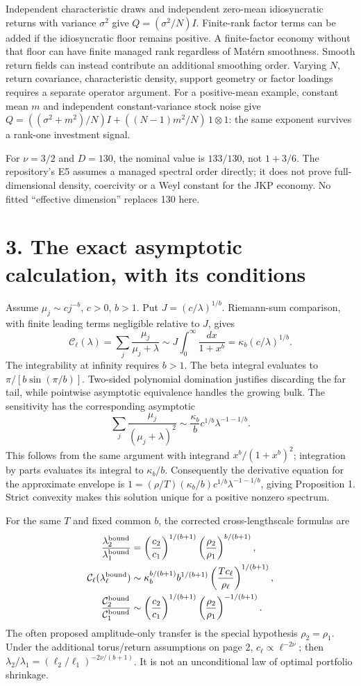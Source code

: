 \documentclass[11pt,letterpaper]{article}
\newcommand{\C}{\mathcal C}
\begin{document}
Independent characteristic draws and independent zero-mean idiosyncratic
returns with variance $\sigma^2$ give $Q=(\sigma^2/N)I$. Finite-rank factor
terms can be added if the idiosyncratic floor remains positive. A finite-factor
economy without that floor can have finite managed rank regardless of Mat\'ern
smoothness. Smooth return fields can instead contribute an additional smoothing
order. Varying $N$, return covariance, characteristic density, support geometry
or factor loadings requires a separate operator argument.
For a positive-mean example, constant mean $m$ and independent constant-variance
stock noise give $Q=((\sigma^2+m^2)/N)I+((N-1)m^2/N)\,1\otimes1$:
the same exponent survives a rank-one investment signal.

For $\nu=3/2$ and $D=130$, the nominal value is $133/130$, not $1+3/6$.
The repository's E5 assumes a managed spectral order directly; it does not prove
full-dimensional density, coercivity or a Weyl constant for the JKP economy.
No fitted ``effective dimension'' replaces 130 here.

\newpage
\section*{3. The exact asymptotic calculation, with its conditions}
Assume $\mu_j\sim cj^{-b}$, $c>0$, $b>1$. Put $J=(c/\lambda)^{1/b}$.
Riemann-sum comparison, with finite leading terms negligible relative to $J$,
gives
\[
 \C_\ell(\lambda)=\sum_j\frac{\mu_j}{\mu_j+\lambda}
 \sim J\int_0^\infty\frac{dx}{1+x^b}=\kappa_b(c/\lambda)^{1/b}.
\]
The integrability at infinity requires $b>1$. The beta integral evaluates to
$\pi/[b\sin(\pi/b)]$. Two-sided polynomial domination justifies discarding
the far tail, while pointwise asymptotic equivalence handles the growing bulk.
The sensitivity has the corresponding asymptotic
\[
 \sum_j\frac{\mu_j}{(\mu_j+\lambda)^2}
 \sim\frac{\kappa_b}{b}c^{1/b}\lambda^{-1-1/b}.
\]
This follows from the same argument with integrand $x^b/(1+x^b)^2$;
integration by parts evaluates its integral to $\kappa_b/b$.
Consequently the derivative equation for the approximate envelope is
$1=(\rho/T)(\kappa_b/b)c^{1/b}\lambda^{-1-1/b}$, giving Proposition 1.
Strict convexity makes this solution unique for a positive nonzero spectrum.

For the same $T$ and fixed common $b$, the corrected cross-lengthscale formulas are
\begin{align*}
 \frac{\lambda_2^{\rm bound}}{\lambda_1^{\rm bound}}
 &=\left(\frac{c_2}{c_1}\right)^{1/(b+1)}
   \left(\frac{\rho_2}{\rho_1}\right)^{b/(b+1)},\\
 \C_\ell(\lambda_\ell^{\rm bound})
 &\sim\kappa_b^{b/(b+1)}b^{1/(b+1)}
       \left(\frac{Tc_\ell}{\rho_\ell}\right)^{1/(b+1)},\\
 \frac{\C_2^{\rm bound}}{\C_1^{\rm bound}}
 &\sim\left(\frac{c_2}{c_1}\right)^{1/(b+1)}
       \left(\frac{\rho_2}{\rho_1}\right)^{-1/(b+1)}.
\end{align*}
The often proposed amplitude-only transfer is the special hypothesis
$\rho_2=\rho_1$. Under the additional torus/return assumptions on page 2,
$c_\ell\propto\ell^{-2\nu}$; then
$\lambda_2/\lambda_1=(\ell_2/\ell_1)^{-2\nu/(b+1)}$.
It is not an unconditional law of optimal portfolio shrinkage.
\end{document}
